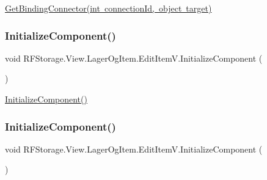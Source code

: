 \mbox{\hyperlink{class_r_f_storage_1_1_view_1_1_lager_og_item_1_1_edit_item_v_a4b7cae61d2ae50e049e152a2f24d71d9}{Get\+Binding\+Connector(int connection\+Id, object target)}} 

\mbox{\label{class_r_f_storage_1_1_view_1_1_lager_og_item_1_1_edit_item_v_aa9126c5d0f8c80176b47690bc8a76eb2}} 
\subsubsection{\texorpdfstring{InitializeComponent()}{InitializeComponent()}\hspace{0.1cm}{\footnotesize\ttfamily [1/8]}}
{\footnotesize\ttfamily void R\+F\+Storage.\+View.\+Lager\+Og\+Item.\+Edit\+Item\+V.\+Initialize\+Component (\begin{DoxyParamCaption}{ }\end{DoxyParamCaption})}



\mbox{\hyperlink{class_r_f_storage_1_1_view_1_1_lager_og_item_1_1_edit_item_v_aa9126c5d0f8c80176b47690bc8a76eb2}{Initialize\+Component()}} 

\mbox{\label{class_r_f_storage_1_1_view_1_1_lager_og_item_1_1_edit_item_v_aa9126c5d0f8c80176b47690bc8a76eb2}} 
\subsubsection{\texorpdfstring{InitializeComponent()}{InitializeComponent()}\hspace{0.1cm}{\footnotesize\ttfamily [2/8]}}
{\footnotesize\ttfamily void R\+F\+Storage.\+View.\+Lager\+Og\+Item.\+Edit\+Item\+V.\+Initialize\+Component (\begin{DoxyParamCaption}{ }\end{DoxyParamCaption})}



